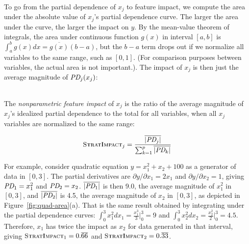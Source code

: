 \documentclass[11pt]{article}
\newcommand{\figref}[1]{Figure~\ref{#1}}
\newcommand{\simp}{\fontfamily{cmr}\textsc{\small StratImpact}}
\begin{document}
To go from the partial dependence of $x_j$ to feature impact, we compute the area under the absolute value of $x_j$'s partial dependence curve. The larger the area under the curve, the larger the impact on $y$.   By the mean-value theorem of integrals, the area under continuous function $g(x)$ in interval $[a,b]$ is $\int_{a}^{b} g(x) dx = \overline{g(x)}(b-a)$, but the $b-a$ term drops out if we normalize all variables to the same range, such as $[0,1]$. (For comparison purposes between variables, the actual area is not important.). The impact of $x_j$ is then just the average magnitude of $\text{\it PD}_j(x_j)$:

~\\
 The {\em nonparametric feature impact} of $x_j$ is the ratio of the average magnitude of $x_j$'s idealized partial dependence to the total for all variables, when all $x_j$ variables are normalized to the same range:

\begin{equation}\label{eq:Epd2a}
\simp_j = \frac{\overline{|\text{\it PD}_j|}}{\sum_{k=1}^p \overline{|\text{\it PD}_k|}}
\end{equation}

\noindent For example, consider quadratic equation $y = x_1^2 + x_2 + 100$ as a generator of data in $[0,3]$. The partial derivatives are ${\partial y}/{\partial x_1} = 2 x_1$ and ${\partial y}/{\partial x_2} = 1$, giving $\text{\it PD}_1 = x_1^2$ and $\text{\it PD}_2 = x_2$. $\overline{|\text{\it PD}_1|}$ is then 9.0, the average magnitude of $x_1^2$ in $[0,3]$, and $\overline{|\text{\it PD}_2|}$ is 4.5, the average magnitude of $x_2$ in $[0,3]$, as depicted in \figref{fig:quad-area}(a). That is the same result obtained by integrating under the partial dependence curves:  $\int_0^3 x_1^2 dx_1 = \frac{x_1^3}{3} \big |_0^3 = 9$ and $\int_0^3 x_2^2 dx_2 = \frac{x_2^2}{2} \big |_0^3 = 4.5$.   Therefore, $x_1$ has twice the impact as $x_2$ for data generated in that interval, giving $\simp_1 = 0.\overline{66}$ and $\simp_2 = 0.\overline{33}$.
\end{document}
